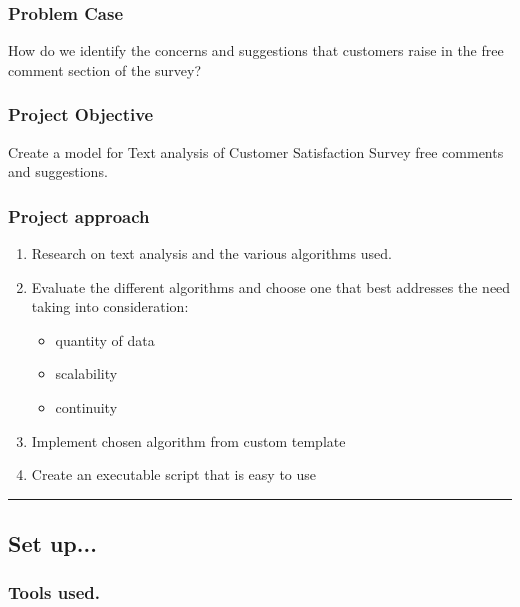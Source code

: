 \documentclass[11pt]{article}
\providecommand{\tightlist}{%
      \setlength{\itemsep}{0pt}\setlength{\parskip}{0pt}}
\begin{document}
\subsubsection{Problem Case}\label{problem-case}

How do we identify the concerns and suggestions that customers raise in
the free comment section of the survey?

\subsubsection{Project Objective}\label{project-objective}

Create a model for Text analysis of Customer Satisfaction Survey free
comments and suggestions.

\subsubsection{Project approach}\label{project-approach}

\begin{enumerate}
\def\labelenumi{\arabic{enumi}.}
\tightlist
\item
  Research on text analysis and the various algorithms used.
\item
  Evaluate the different algorithms and choose one that best addresses
  the need taking into consideration:

  \begin{itemize}
  \tightlist
  \item
    quantity of data
  \item
    scalability
  \item
    continuity
  \end{itemize}
\item
  Implement chosen algorithm from custom template
\item
  Create an executable script that is easy to use
\end{enumerate}

\begin{center}\rule{0.5\linewidth}{\linethickness}\end{center}

\subsection{Set up...}\label{set-up...}

\subsubsection{Tools used.}\label{tools-used.}
\end{document}
